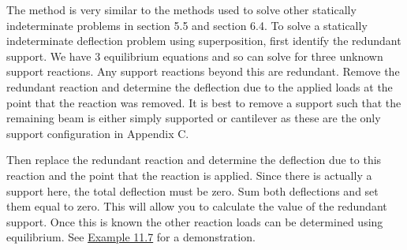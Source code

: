 \documentclass[
  letterpaper,
  DIV=11,
  numbers=noendperiod]{scrreprt}
\begin{document}
The method is very similar to the methods used to solve other statically
indeterminate problems in section 5.5 and section 6.4. To solve a
statically indeterminate deflection problem using superposition, first
identify the redundant support. We have 3 equilibrium equations and so
can solve for three unknown support reactions. Any support reactions
beyond this are redundant. Remove the redundant reaction and determine
the deflection due to the applied loads at the point that the reaction
was removed. It is best to remove a support such that the remaining beam
is either simply supported or cantilever as these are the only support
configuration in Appendix C.

Then replace the redundant reaction and determine the deflection due to
this reaction and the point that the reaction is applied. Since there is
actually a support here, the total deflection must be zero. Sum both
deflections and set them equal to zero. This will allow you to calculate
the value of the redundant support. Once this is known the other
reaction loads can be determined using equilibrium. See
\hyperref[example-11.7]{Example 11.7} for a demonstration.
\end{document}
